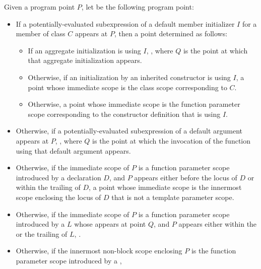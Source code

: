 \begin{itemdescr}
\pnum
Given a program point $P$,
let  be the following program point:
\begin{itemize}
\item
  If a potentially-evaluated subexpression
  of a default member initializer $I$
  for a member of class $C$
  appears at $P$,
  then a point determined as follows:
  \begin{itemize}
  \item
    If an aggregate initialization is using $I$,
    ,
    where $Q$ is the point at which that aggregate initialization appears.
  \item
    Otherwise, if an initialization
    by an inherited constructor is using $I$,
    a point whose immediate scope is the class scope corresponding to $C$.
  \item
    Otherwise, a point whose immediate scope
    is the function parameter scope
    corresponding to the constructor definition that is using $I$.
  \end{itemize}
  \item
    Otherwise, if a potentially-evaluated subexpression
    of a default argument appears at $P$,
    ,
    where $Q$ is the point at which the invocation of the function
    using that default argument appears.
  \item
    Otherwise, if the immediate scope of $P$
    is a function parameter scope introduced by a declaration $D$,
    and $P$ appears either before the locus of $D$
    or within the trailing  of $D$,
    a point whose immediate scope is the innermost scope enclosing the locus of $D$
    that is not a template parameter scope.
  \item
    Otherwise, if the immediate scope of $P$
    is a function parameter scope
    introduced by a  $L$
    whose  appears at point $Q$,
    and $P$ appears either within the 
    or the trailing  of $L$,
    .
  \item
    Otherwise, if the innermost non-block scope enclosing $P$
    is the function parameter scope
    introduced by a ,

\end{itemize}
\end{itemdescr}
